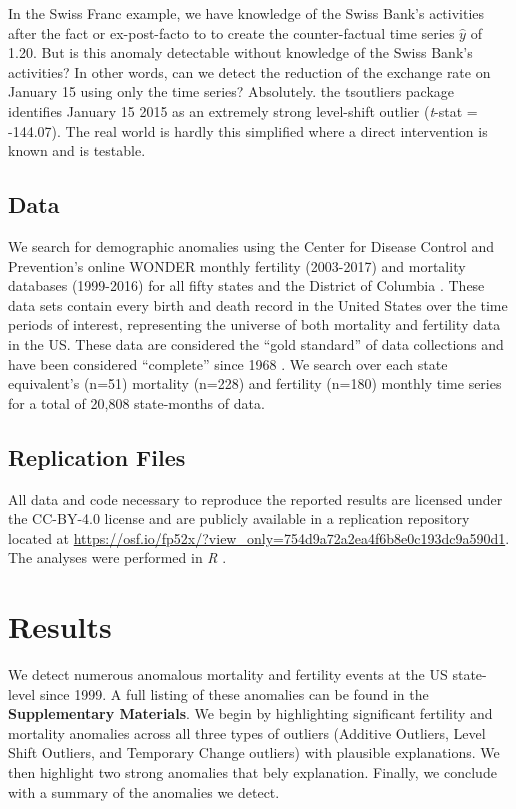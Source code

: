 \documentclass[12pt]{article}
\begin{document}
In the Swiss Franc example, we have knowledge of the Swiss Bank's
activities after the fact or ex-post-facto to to create the
counter-factual time series \(\hat{y}\) of 1.20. But is this anomaly
detectable without knowledge of the Swiss Bank's activities? In other
words, can we detect the reduction of the exchange rate on January 15
using only the time series? Absolutely. the tsoutliers package
identifies January 15 2015 as an extremely strong level-shift outlier
(\emph{t}-stat = -144.07). The real world is hardly this simplified
where a direct intervention is known and is testable.

\hypertarget{data}{%
\subsection{Data}\label{data}}

We search for demographic anomalies using the Center for Disease Control
and Prevention's online WONDER monthly fertility (2003-2017) and
mortality databases (1999-2016) for all fifty states and the District of
Columbia \citep{CDC_fert07, CDC_mort}. These data sets contain every
birth and death record in the United States over the time periods of
interest, representing the universe of both mortality and fertility data
in the US. These data are considered the ``gold standard'' of data
collections \citep{mahapatra2007civil} and have been considered
``complete'' since 1968 \citep{hetzel2016us}. We search over each state
equivalent's (n=51) mortality (n=228) and fertility (n=180) monthly time
series for a total of 20,808 state-months of data.

\hypertarget{replication-files}{%
\subsection{Replication Files}\label{replication-files}}

All data and code necessary to reproduce the reported results are
licensed under the CC-BY-4.0 license and are publicly available in a
replication repository located at
\url{https://osf.io/fp52x/?view_only=754d9a72a2ea4f6b8e0c193dc9a590d1}.
The analyses were performed in \emph{R} \citep{rcite}.

\hypertarget{results}{%
\section{Results}\label{results}}

We detect numerous anomalous mortality and fertility events at the US
state-level since 1999. A full listing of these anomalies can be found
in the \textbf{Supplementary Materials}. We begin by highlighting
significant fertility and mortality anomalies across all three types of
outliers (Additive Outliers, Level Shift Outliers, and Temporary Change
outliers) with plausible explanations. We then highlight two strong
anomalies that bely explanation. Finally, we conclude with a summary of
the anomalies we detect.
\end{document}
